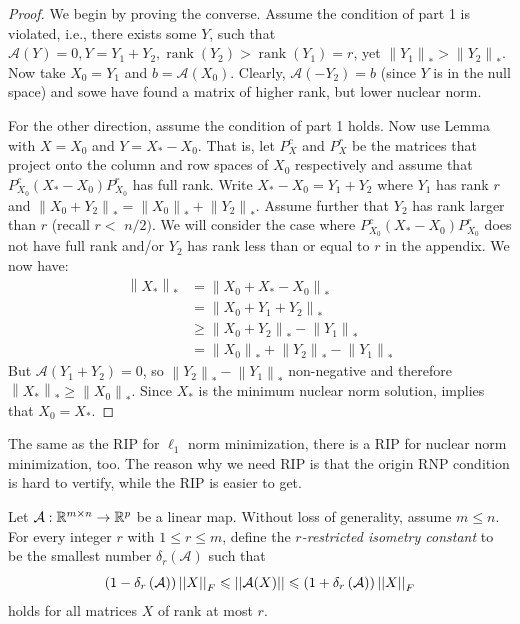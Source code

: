 \documentclass[11pt]{article}
\begin{document}
\begin{proof}
    We begin by proving the converse. Assume the condition of part 1 is violated, i.e., there exists some $Y$, such that $\mathcal{A}(Y)=0, Y=Y_{1}+Y_{2}, \operatorname{rank}\left(Y_{2}\right)>\operatorname{rank}\left(Y_{1}\right)=r$, yet $\left\|Y_{1}\right\|_{*}>\left\|Y_{2}\right\|_{*}$. Now take $X_{0}=Y_{1}$ and $b=\mathcal{A}\left(X_{0}\right)$. Clearly, $\mathcal{A}\left(-Y_{2}\right)=b$ (since $Y$ is in the null space) and sowe have found a matrix of higher rank, but lower nuclear norm.

    For the other direction, assume the condition of part 1 holds. Now use Lemma with $X=X_{0}$ and $Y=X_{*}-X_{0}$. That is, let $P_{X}^{c}$ and $P_{X}^{r}$ be the matrices that project onto the column and row spaces of $X_{0}$ respectively and assume that $P_{X_{0}}^{c}\left(X_{*}-X_{0}\right) P_{X_{0}}^{r}$ has full rank. Write $X_{*}-X_{0}=Y_{1}+Y_{2}$ where $Y_{1}$ has rank $r$ and $\left\|X_{0}+Y_{2}\right\|_{*}=\left\|X_{0}\right\|_{*}+\left\|Y_{2}\right\|_{*}$. Assume further that $Y_{2}$ has rank larger than $r$ (recall $r<$ $n / 2)$. We will consider the case where $P_{X_{0}}^{c}\left(X_{*}-X_{0}\right) P_{X_{0}}^{r}$ does not have full rank and/or $Y_{2}$ has rank less than or equal to $r$ in the appendix. We now have:
    $$
    \begin{aligned}
    \left\|X_{*}\right\|_{*} &=\left\|X_{0}+X_{*}-X_{0}\right\|_{*} \\
    &=\left\|X_{0}+Y_{1}+Y_{2}\right\|_{*} \\
    & \geq\left\|X_{0}+Y_{2}\right\|_{*}-\left\|Y_{1}\right\|_{*} \\
    &=\left\|X_{0}\right\|_{*}+\left\|Y_{2}\right\|_{*}-\left\|Y_{1}\right\|_{*}
    \end{aligned}
    $$
    But $\mathcal{A}\left(Y_{1}+Y_{2}\right)=0$, so $\left\|Y_{2}\right\|_{*}-\left\|Y_{1}\right\|_{*}$ non-negative and therefore $\left\|X_{*}\right\|_{*} \geq\left\|X_{0}\right\|_{*}$. Since $X_{*}$ is the minimum nuclear norm solution, implies that $X_{0}=X_{*}$.
\end{proof}

The same as the RIP for \(\ell_1\) norm minimization, there is a RIP for nuclear norm minimization, too. The reason why we need RIP is that the origin RNP condition is hard to vertify, while the RIP is easier to get.

\begin{definition}
    Let \(\mathcal{A}: \mathbb R^{m \times n}\to\mathbb R^{p}\) be a linear map. Without loss of generality, assume \(m \leqslant n\). For every integer \(r\) with \(1 \leqslant r \leqslant m\), define the \emph{\(r\)-restricted isometry constant} to be the smallest number \(\delta_{r}(\mathcal{A})\) such that
    \[\left(1-\delta_r\left(\mathcal A\right)\right)\left|\left|X\right|\right|_F\leqslant\left|\left|\mathcal A(X)\right|\right|\leqslant\left(1+\delta_r\left(\mathcal A\right)\right)\left|\left|X\right|\right|_F\]
    holds for all matrices \(X\) of rank at most \(r\).
\end{definition}
\end{document}
